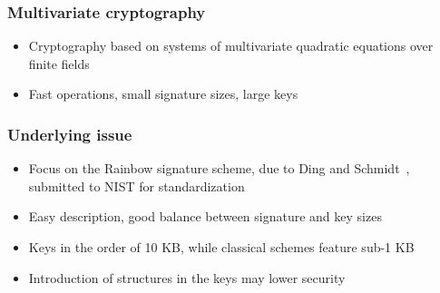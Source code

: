 \documentclass[12pt]{beamer}
\begin{document}
\begin{frame}
  \frametitle{Multivariate cryptography}
  \begin{itemize}
    \item Cryptography based on systems of multivariate quadratic equations
        over finite fields
    \begin{figure}
      \vspace{2mm}
      \centering
    \end{figure}
    \item Fast operations, small signature sizes, large keys
  \end{itemize}
\end{frame}

\begin{frame}
  \frametitle{Underlying issue}
  \begin{itemize}
    \item Focus on the Rainbow signature scheme, due to Ding and
        Schmidt~\cite{Ding:inproc:2005:jun}, submitted to NIST for
          standardization
    \item Easy description, good balance between signature and key sizes
    \item Keys in the order of 10 KB, while classical schemes feature sub-1 KB
    \item Introduction of structures in the keys may lower security
  \end{itemize}
\end{frame}
\end{document}
